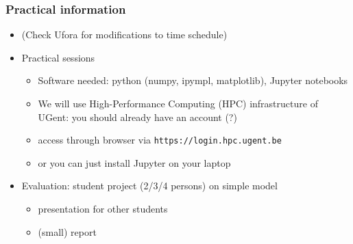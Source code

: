 \documentclass[aspectratio=149,9pt]{beamer}
\begin{document}
\begin{frame}
	\frametitle{Practical information}
	\begin{itemize}
		\item (Check Ufora for modifications to time schedule)\vspace*{2ex}
		\item Practical sessions\vspace*{1ex}
			\begin{itemize}
        		\item Software needed: python (numpy, ipympl, matplotlib), Jupyter notebooks\vspace*{2ex}
				\item We will use High-Performance Computing (HPC) infrastructure of UGent: you should already have an account (?)\vspace*{1ex}
				\item access through browser via \texttt{https://login.hpc.ugent.be}\vspace*{1ex}
				\item or you can just install Jupyter on your laptop\vspace*{2ex}
			\end{itemize}
		\item Evaluation: student project (2/3/4 persons) on simple model\vspace*{1ex}
			\begin{itemize}
				\item presentation for other students\vspace*{1ex}
				\item (small) report
			\end{itemize}
	\end{itemize}
\end{frame}
%
%
\begin{frame}
	\begin{center}
	\end{center}
\end{frame}
%
%
\end{document}
